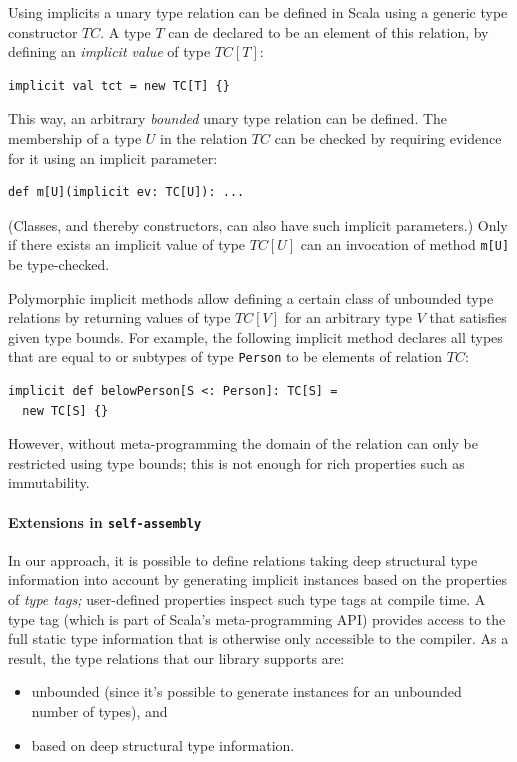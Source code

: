 \documentclass[preprint]{sigplanconf}
\newcommand{\selfassembly}{\texttt{self-assembly~}}
\begin{document}
Using implicits a unary type relation can be defined in Scala using a generic
type constructor $TC$. A type $T$ can de declared to be an element of this
relation, by defining an {\em implicit value} of type $TC[T]$:

\begin{lstlisting}
implicit val tct = new TC[T] {}
\end{lstlisting}
\noindent
This way, an arbitrary {\em bounded} unary type relation can be defined. The
membership of a type $U$ in the relation $TC$ can be checked by requiring evidence
for it using an implicit parameter:

\begin{lstlisting}
def m[U](implicit ev: TC[U]): ...
\end{lstlisting}
\noindent
(Classes, and thereby constructors, can also have such implicit parameters.)
Only if there exists an implicit value of type $TC[U]$ can an invocation
of method \verb|m[U]| be type-checked.

Polymorphic implicit methods allow defining a certain class of unbounded type
relations by returning values of type $TC[V]$ for an arbitrary type $V$ that satisfies
given type bounds. For example, the following implicit method declares all types that
are equal to or subtypes of type \verb|Person| to be elements of relation $TC$:

\begin{lstlisting}
implicit def belowPerson[S <: Person]: TC[S] =
  new TC[S] {}
\end{lstlisting}
\noindent
However, without meta-programming the domain of the relation can only be
restricted using type bounds; this is not enough for rich properties such as
immutability.

\paragraph{Extensions in \selfassembly}
In our approach, it is possible to define relations taking deep
structural type information into account by generating implicit instances
based on the properties of {\em type tags;} user-defined properties inspect
such type tags at compile time. A type tag (which is part of Scala’s
meta-programming API) provides access to the full static type
information that is otherwise only accessible to the compiler. As a result,
the type relations that our library supports are:

\begin{itemize}
\item unbounded (since it’s possible to generate instances for an unbounded number of types), and
\item based on deep structural type information.
\end{itemize}
\end{document}

